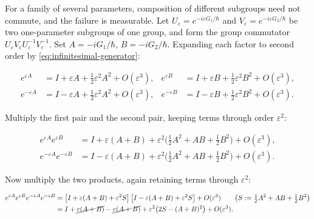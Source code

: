 For a family of several parameters, composition of different subgroups need not commute, and the failure is measurable. Let $U_\varepsilon=e^{-i\varepsilon G_1/\hbar}$ and $V_\varepsilon=e^{-i\varepsilon G_2/\hbar}$ be two one-parameter subgroups of one group, and form the group commutator $U_\varepsilon V_\varepsilon U_\varepsilon^{-1}V_\varepsilon^{-1}$. Set $A=-iG_1/\hbar$, $B=-iG_2/\hbar$. Expanding each factor to second order by \eqref{eq:infinitesimal-generator}:
\begin{linenomath}
    \begin{align*}
        e^{\varepsilon A} &= I + \varepsilon A + \tfrac{1}{2}\varepsilon^{2}A^{2} + O(\varepsilon^{3}), &
        e^{\varepsilon B} &= I + \varepsilon B + \tfrac{1}{2}\varepsilon^{2}B^{2} + O(\varepsilon^{3}),\\
        e^{-\varepsilon A} &= I - \varepsilon A + \tfrac{1}{2}\varepsilon^{2}A^{2} + O(\varepsilon^{3}), &
        e^{-\varepsilon B} &= I - \varepsilon B + \tfrac{1}{2}\varepsilon^{2}B^{2} + O(\varepsilon^{3}) .
    \end{align*}
\end{linenomath}
Multiply the first pair and the second pair, keeping terms through order $\varepsilon^{2}$:
\begin{linenomath}
    \begin{align*}
        e^{\varepsilon A}e^{\varepsilon B}
        &= I + \varepsilon(A+B) + \varepsilon^{2}\bigl(\tfrac{1}{2}A^{2} + AB + \tfrac{1}{2}B^{2}\bigr) + O(\varepsilon^{3}),\\
        e^{-\varepsilon A}e^{-\varepsilon B}
        &= I - \varepsilon(A+B) + \varepsilon^{2}\bigl(\tfrac{1}{2}A^{2} + AB + \tfrac{1}{2}B^{2}\bigr) + O(\varepsilon^{3}) .
    \end{align*}
\end{linenomath}
Now multiply the two products, again retaining terms through $\varepsilon^{2}$:
\begin{linenomath}
    \begin{align*}
        e^{\varepsilon A}e^{\varepsilon B}e^{-\varepsilon A}e^{-\varepsilon B}
        &= \bigl[I + \varepsilon(A+B) + \varepsilon^{2}S\bigr]\,
           \bigl[I - \varepsilon(A+B) + \varepsilon^{2}S\bigr] + O(\varepsilon^{3})
           \qquad\bigl(S := \tfrac{1}{2}A^{2}+AB+\tfrac{1}{2}B^{2}\bigr)\\
        &= I + \cancel{\varepsilon(A+B)} - \cancel{\varepsilon(A+B)}
           + \varepsilon^{2}\bigl(2S - (A+B)^{2}\bigr) + O(\varepsilon^{3}) .
    \end{align*}
\end{linenomath}
